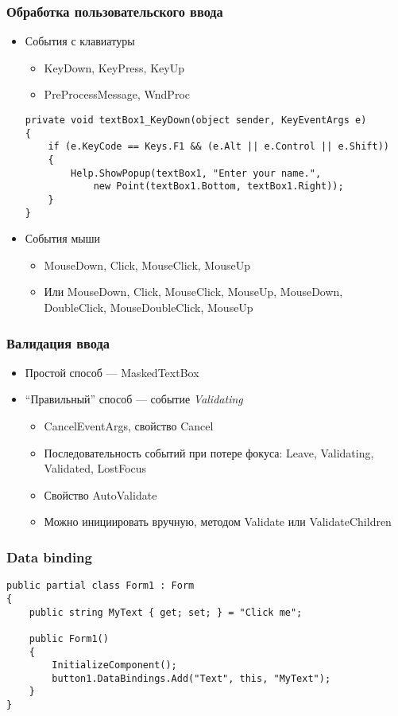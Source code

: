 \documentclass[xetex,mathserif,serif]{beamer}
\begin{document}
	\begin{frame}[fragile]
		\frametitle{Обработка пользовательского ввода}
		\begin{itemize}
			\item События с клавиатуры
			\begin{itemize}
				\item KeyDown, KeyPress, KeyUp
				\item PreProcessMessage, WndProc
			\end{itemize}
			\begin{scriptsize}
				\begin{verbatim}
private void textBox1_KeyDown(object sender, KeyEventArgs e)
{
    if (e.KeyCode == Keys.F1 && (e.Alt || e.Control || e.Shift))
    {
        Help.ShowPopup(textBox1, "Enter your name.", 
            new Point(textBox1.Bottom, textBox1.Right));
    }
}
				\end{verbatim}
			\end{scriptsize}
			\item События мыши
			\begin{itemize}
				\item MouseDown, Click, MouseClick, MouseUp
				\item Или MouseDown, Click, MouseClick, MouseUp, MouseDown, DoubleClick, MouseDoubleClick, MouseUp
			\end{itemize}
		\end{itemize}
	\end{frame}

	\begin{frame}
		\frametitle{Валидация ввода}
		\begin{itemize}
			\item Простой способ --- MaskedTextBox
			\item ``Правильный'' способ --- событие \textit{Validating}
			\begin{itemize}
				\item CancelEventArgs, свойство Cancel
				\item Последовательность событий при потере фокуса: Leave, Validating, Validated, LostFocus
				\item Свойство AutoValidate
				\item Можно инициировать вручную, методом Validate или ValidateChildren
			\end{itemize}
		\end{itemize}
	\end{frame}

	\begin{frame}[fragile]
		\frametitle{Data binding}
		\begin{verbatim}
public partial class Form1 : Form
{
    public string MyText { get; set; } = "Click me";

    public Form1()
    {
        InitializeComponent();
        button1.DataBindings.Add("Text", this, "MyText");
    }
}
		\end{verbatim}
	\end{frame}
\end{document}
